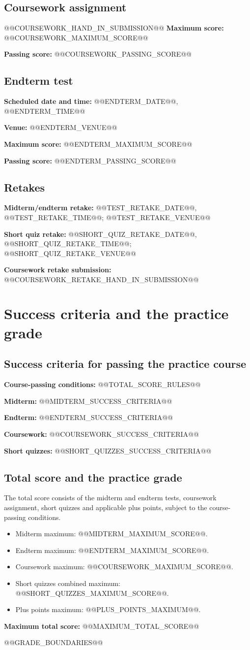 \documentclass[11pt,a4paper]{article}
\newcommand{\field}[2]{\textbf{#1:} #2\par}
\begin{document}
\subsection*{Coursework assignment}
@@COURSEWORK_HAND_IN_SUBMISSION@@
\field{Maximum score}{@@COURSEWORK_MAXIMUM_SCORE@@}
\field{Passing score}{@@COURSEWORK_PASSING_SCORE@@}
\subsection*{Endterm test}
\field{Scheduled date and time}{@@ENDTERM_DATE@@, @@ENDTERM_TIME@@}
\field{Venue}{@@ENDTERM_VENUE@@}
\field{Maximum score}{@@ENDTERM_MAXIMUM_SCORE@@}
\field{Passing score}{@@ENDTERM_PASSING_SCORE@@}
\subsection*{Retakes}
\field{Midterm/endterm retake}{@@TEST_RETAKE_DATE@@, @@TEST_RETAKE_TIME@@; @@TEST_RETAKE_VENUE@@}
\field{Short quiz retake}{@@SHORT_QUIZ_RETAKE_DATE@@, @@SHORT_QUIZ_RETAKE_TIME@@; @@SHORT_QUIZ_RETAKE_VENUE@@}
\field{Coursework retake submission}{@@COURSEWORK_RETAKE_HAND_IN_SUBMISSION@@}

\section*{Success criteria and the practice grade}
\subsection*{Success criteria for passing the practice course}
\field{Course-passing conditions}{@@TOTAL_SCORE_RULES@@}
\field{Midterm}{@@MIDTERM_SUCCESS_CRITERIA@@}
\field{Endterm}{@@ENDTERM_SUCCESS_CRITERIA@@}
\field{Coursework}{@@COURSEWORK_SUCCESS_CRITERIA@@}
\field{Short quizzes}{@@SHORT_QUIZZES_SUCCESS_CRITERIA@@}

\subsection*{Total score and the practice grade}
The total score consists of the midterm and endterm tests, coursework assignment,
short quizzes and applicable plus points, subject to the course-passing conditions.
\begin{itemize}
\item Midterm maximum: @@MIDTERM_MAXIMUM_SCORE@@.
\item Endterm maximum: @@ENDTERM_MAXIMUM_SCORE@@.
\item Coursework maximum: @@COURSEWORK_MAXIMUM_SCORE@@.
\item Short quizzes combined maximum: @@SHORT_QUIZZES_MAXIMUM_SCORE@@.
\item Plus points maximum: @@PLUS_POINTS_MAXIMUM@@.
\end{itemize}
\field{Maximum total score}{@@MAXIMUM_TOTAL_SCORE@@}
@@GRADE_BOUNDARIES@@
\end{document}
